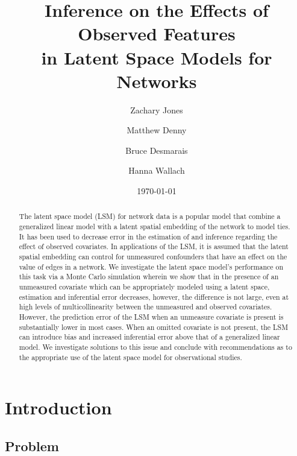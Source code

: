 \documentclass[12pt]{article}
\title{\vspace{-2cm} Inference on the Effects of Observed Features 
\\ in Latent Space Models for Networks }
\author{ Zachary Jones \and Matthew Denny \and Bruce Desmarais \and Hanna Wallach} \date{\today}
\begin{document}
\maketitle




\begin{abstract}

\noindent The latent space model (LSM) for network data is a popular model that combine a generalized linear model with a latent spatial embedding of the network to model ties. It has been used to decrease error in the estimation of and inference regarding the effect of observed covariates. In applications of the LSM, it is assumed that the latent spatial embedding can control for unmeasured confounders that have an effect on the value of edges in a network. We investigate the latent space model's performance on this task via a Monte Carlo simulation wherein we show that in the presence of an unmeasured covariate which can be appropriately modeled using a latent space, estimation and inferential error decreases, however, the difference is not large, even at high levels of multicollinearity between the unmeasured and observed covariates. However, the prediction error of the LSM when an unmeasure covariate is present is substantially lower in most cases. When an omitted covariate is not present, the LSM can introduce bias and increased inferential error above that of a generalized linear model. We investigate solutions to this issue and conclude with recommendations as to the appropriate use of the latent space model for observational studies.

\end{abstract}
\thispagestyle{empty}
\section{Introduction}

\subsection{Problem}
\end{document}
